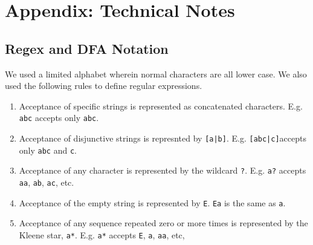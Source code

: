 \documentclass[10pt,letterpaper]{article}
\begin{document}





% 


% 

\section{Appendix: Technical Notes}
\subsection{Regex and DFA Notation}
We used a limited alphabet wherein normal characters are all lower case. We also used the following rules to define regular expressions.
\begin{enumerate}
	\item Acceptance of specific strings is represented as concatenated characters. E.g. \verb!abc! accepts only \verb!abc!.
	\item Acceptance of disjunctive strings is represnted by \verb![a|b]!. E.g. \verb![abc|c]!accepts only \verb!abc! and \verb!c!.
	\item Acceptance of any character is represented by the wildcard \verb!?!. E.g. \verb!a?! accepts \verb!aa!, \verb!ab!, \verb!ac!, etc.
	\item Acceptance of the empty string is represented by \verb!E!. \verb!Ea! is the same as \verb!a!.
	\item Acceptance of any sequence repeated zero or more times is represented by the Kleene star, \verb!a*!. E.g. \verb!a*! accepts \verb!E!, \verb!a!, \verb!aa!, etc, 
\end{enumerate}
\end{document}
